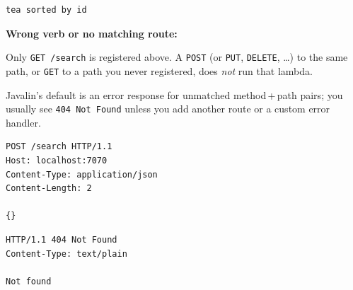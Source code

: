 \begin{solution}
\begin{httpexchange}
\begin{lstlisting}[style=http]
tea sorted by id
\end{lstlisting}
  \end{httpexchange}

  \noindent\textbf{Wrong verb or no matching route:}\par
  \noindent Only \texttt{GET /search} is registered above. A \texttt{POST} (or \texttt{PUT}, \texttt{DELETE}, \ldots) to the same path, or \texttt{GET} to a path you never registered, does \emph{not} run that lambda.\par
  \noindent Javalin's default is an error response for unmatched method\,+\,path pairs; you usually see \texttt{404 Not Found} unless you add another route or a custom error handler.\par
  \begin{httpexchange}
\begin{lstlisting}[style=http]
POST /search HTTP/1.1
Host: localhost:7070
Content-Type: application/json
Content-Length: 2

{}
\end{lstlisting}
\httpmidarrows
\begin{lstlisting}[style=http]
HTTP/1.1 404 Not Found
Content-Type: text/plain

Not found
\end{lstlisting}
  \end{httpexchange}
\end{solution}

\newpage

